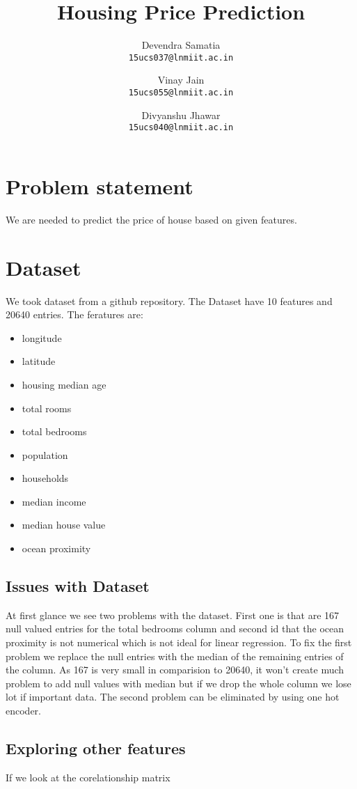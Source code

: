 \documentclass[a4paper,10pt]{article}
\title{Housing Price Prediction}
\author{
  Devendra Samatia\\
  \texttt{15ucs037@lnmiit.ac.in}
  \and
  Vinay Jain\\
  \texttt{15ucs055@lnmiit.ac.in}
 \and
  Divyanshu Jhawar\\
  \texttt{15ucs040@lnmiit.ac.in}
}
\begin{document}
\maketitle
\section{Problem statement}
We are needed to predict the price of house based on given features. 

\section{Dataset}
We took dataset from a github repository\cite{githubSolution}. The Dataset have 10 features and 20640 entries.
The feratures are:

\begin{itemize}
  	\item longitude
 	 \item	latitude	
 	\item housing median age	
	\item total rooms	
	 \item total bedrooms	
 	\item population	 
	\item households	
	\item median income	
	\item median house value	
	\item ocean proximity
\end{itemize}

\subsection{Issues with Dataset}
At first glance we see two problems with the dataset. First one is that are 167 null valued entries for the total bedrooms column and second id that the ocean proximity is  not numerical which is not ideal for linear regression.
To fix the first problem we replace the null entries with the median of the remaining entries of the column. As 167 is very small in comparision to 20640, it won't create much problem to add null values with median but if we drop the whole column we lose lot if important data. The second problem can be eliminated by using one hot encoder.

\subsection{Exploring other features}

If we look at the corelationship matrix 


\medskip


\end{document}
